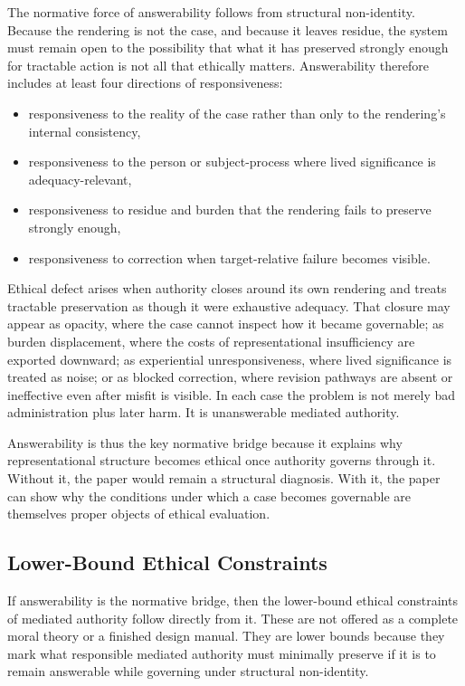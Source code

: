 \documentclass[11pt]{article}
\begin{document}
The normative force of answerability follows from structural non-identity. Because the rendering is not the case, and because it leaves residue, the system must remain open to the possibility that what it has preserved strongly enough for tractable action is not all that ethically matters. Answerability therefore includes at least four directions of responsiveness:
\begin{itemize}
    \item responsiveness to the reality of the case rather than only to the rendering's internal consistency,
    \item responsiveness to the person or subject-process where lived significance is adequacy-relevant,
    \item responsiveness to residue and burden that the rendering fails to preserve strongly enough,
    \item responsiveness to correction when target-relative failure becomes visible.
\end{itemize}

Ethical defect arises when authority closes around its own rendering and treats tractable preservation as though it were exhaustive adequacy. That closure may appear as opacity, where the case cannot inspect how it became governable; as burden displacement, where the costs of representational insufficiency are exported downward; as experiential unresponsiveness, where lived significance is treated as noise; or as blocked correction, where revision pathways are absent or ineffective even after misfit is visible. In each case the problem is not merely bad administration plus later harm. It is unanswerable mediated authority.

Answerability is thus the key normative bridge because it explains why representational structure becomes ethical once authority governs through it. Without it, the paper would remain a structural diagnosis. With it, the paper can show why the conditions under which a case becomes governable are themselves proper objects of ethical evaluation.

\subsection{Lower-Bound Ethical Constraints}

If answerability is the normative bridge, then the lower-bound ethical constraints of mediated authority follow directly from it. These are not offered as a complete moral theory or a finished design manual. They are lower bounds because they mark what responsible mediated authority must minimally preserve if it is to remain answerable while governing under structural non-identity. \cite{MoynihanHerdHarvey2015AdministrativeBurden,Eubanks2018AutomatingInequality,LepriEtAl2018FairTransparentAccountableADM,Tabassi2023NISTAIRMF,Swanson2026MediatedJudgmentConstraint,Swanson2026ConstraintConditionDisclosure,Swanson2026EmbeddedProcess}
\end{document}
